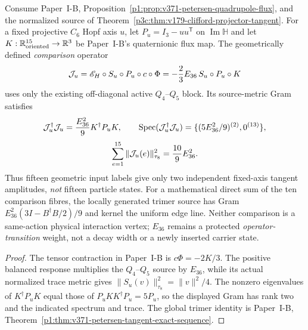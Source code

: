 \documentclass[12pt,a4paper]{article}
\begin{document}
\begin{corollary}
\label{p3c:cor:v371-petersen-e36-comparison}
Consume Paper~I-B, Proposition~\ref{p1:prop:v371-petersen-quadrupole-flux},
and the normalized source of
Theorem~\ref{p3c:thm:v179-clifford-projector-tangent}.
For a fixed projective $C_6$ Hopf axis $u$, let
$P_u=I_3-uu^{\mathsf T}$ on $\operatorname{Im}\mathbb H$ and let
$K:\mathbb R^{15}_{\rm oriented}\to\mathbb R^3$ be Paper~I-B's
quaternionic flux map. The geometrically defined \emph{comparison}
operator
\[
 \mathcal J_u=\mathscr E_H\circ S_u\circ P_u\circ c\circ\Phi
 =-{2\over3}E_{36}\,S_u\circ P_u\circ K
\]
uses only the existing off-diagonal active $Q_4$--$Q_5$ block.
Its source-metric Gram satisfies
\[
 \mathcal J_u^\dagger\mathcal J_u
 ={E_{36}^2\over9}K^\dagger P_uK,
 \qquad\operatorname{Spec}(\mathcal J_u^\dagger\mathcal J_u)
 =\{(5E_{36}^2/9)^{(2)},0^{(13)}\},
\]
\[
 \sum_{e=1}^{15}\|\mathcal J_u(e)\|_{\tau_8}^2
 ={10\over9}E_{36}^2.
\]
Thus fifteen geometric input labels give only two independent
fixed-axis tangent amplitudes, \emph{not} fifteen particle states.
For a mathematical direct sum of the ten comparison fibres, the
locally generated trimer source has Gram
$E_{36}^2(3I-B^\dagger B/2)/9$ and kernel the uniform edge line.
Neither comparison is a same-action physical interaction vertex;
$E_{36}$ remains a protected \emph{operator-transition} weight, not
a decay width or a newly inserted carrier state.
\end{corollary}
\begin{proof}
The tensor contraction in Paper~I-B is
$c\Phi=-2K/3$. The positive balanced response multiplies the
$Q_4$--$Q_5$ source by $E_{36}$, while its actual normalized trace
metric gives $\|S_u(v)\|_{\tau_8}^2=\|v\|^2/4$.
The nonzero eigenvalues of $K^\dagger P_uK$ equal those of
$P_uKK^\dagger P_u=5P_u$, so the displayed Gram has rank two and
the indicated spectrum and trace. The global trimer identity is
Paper~I-B, Theorem~\ref{p1:thm:v371-petersen-tangent-exact-sequence}.
\end{proof}
\end{document}
